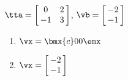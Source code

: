 {$\tta = \left[\hskip -3pt \begin{array}{cc} 0&2\\  -1&3\end {array} \hskip -3pt
 \right]$, $\vb=\left[\hskip -3pt \begin{array}{c} -2\\  -1\end {array} \hskip -3pt
 \right]$}
{\begin{enumerate}
\item	 $\vx=\bmx{c}0\\0\emx$
\item	 $\vx=\left[\hskip -3pt \begin{array}{c} -2\\  -1\end {array} \hskip -3pt
 \right]$
 \end{enumerate}
 }







